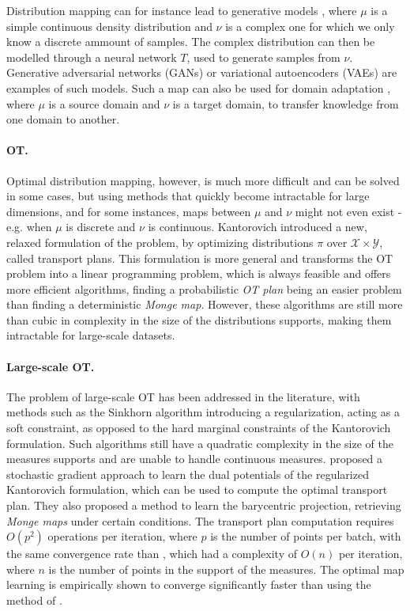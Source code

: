\documentclass[a4paper,11pt]{article}
\newcommand{\1}{\mathbbm{1}}
\begin{document}
Distribution mapping can for instance lead to generative models \citep{bousquet2017optimal}, where $\mu$ is a simple continuous density distribution and $\nu$ is a complex one for which we only know a discrete ammount of samples. The complex distribution can then be modelled through a neural network $T$, used to generate samples from $\nu$. Generative adversarial networks (GANs) or variational autoencoders (VAEs) are examples of such models. Such a map can also be used for domain adaptation \citep{courty2016optimal}, where $\mu$ is a source domain and $\nu$ is a target domain, to transfer knowledge from one domain to another.

\paragraph{OT.}Optimal distribution mapping, however, is much more difficult and can be solved in some cases, but using methods that quickly become intractable for large dimensions, and for some instances, maps between $\mu$ and $\nu$ might not even exist - e.g. when $\mu$ is discrete and $\nu$ is continuous. Kantorovich introduced a new, relaxed formulation of the problem, by optimizing distributions $\pi$ over $\mathcal{X} \times \mathcal{Y}$, called transport plans. This formulation is more general and transforms the OT problem into a linear programming problem, which is always feasible and offers more efficient algorithms, finding a probabilistic \emph{OT plan} being an easier problem than finding a deterministic \emph{Monge map}. However, these algorithms are still more than cubic in complexity in the size of the distributions supports, making them intractable for large-scale datasets.

\paragraph{Large-scale OT.}The problem of large-scale OT has been addressed in the literature, with methods such as the Sinkhorn algorithm \citep{sinkhorn1967diagonal} introducing a regularization, acting as a soft constraint, as opposed to the hard marginal constraints of the Kantorovich formulation. Such algorithms still have a quadratic complexity in the size of the measures supports and are unable to handle continuous measures. \citet{seguy2018largescaleoptimaltransportmapping} proposed a stochastic gradient approach to learn the dual potentials of the regularized Kantorovich formulation, which can be used to compute the optimal transport plan. They also proposed a method to learn the barycentric projection, retrieving \emph{Monge maps} under certain conditions. The transport plan computation requires $O(p^2)$ operations per iteration, where $p$ is the number of points per batch, with the same convergence rate than \citet{NIPS2016_2a27b814}, which had a complexity of $O(n)$ per iteration, where $n$ is the number of points in the support of the measures. The optimal map learning is empirically shown to converge significantly faster than using the method of \citet{NIPS2016_2a27b814}.
\end{document}
